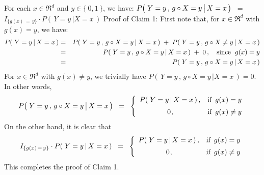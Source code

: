 For each $x \in \Re^{d}$ and $y \in \{\,0,1\,\}$, we have:
$P\!\left(\,\left. Y = y \,,\, \overset{{\color{white}.}}{g} \circ X = y \,\right\vert X = x \,\right)$
\,$=$\,
$I_{\{g(x)\,=\,y\}} \cdot P\!\left(\,\left. Y = y \,\right\vert X = x \,\right)$
\vskip 0.2cm
\noindent
Proof of Claim 1:\;
First note that, for $x \in \Re^{d}$ with $g(x) = y$, we have:
\begin{eqnarray*}
P\!\left(\,\left. Y = y \,\right\vert X = x \,\right)
& = &
	P\!\left(\,\left. Y = y\,,\, g \circ X = y \,\right\vert X = x \,\right)
	\; + \;
	P\!\left(\,\left. Y = y\,,\, g \circ X \neq y \,\right\vert X = x \,\right)
\\
& = &
	P\!\left(\,\left. Y = y\,,\, g \circ X = y \,\right\vert X = x \,\right)
	\; + \;
	0\,,
	\quad
	\textnormal{since \;$g(x) = y$}
\\
& = &
	P\!\left(\,\left. Y = y\,,\, g \circ X = y \,\right\vert X = x \,\right)
\end{eqnarray*}
For $x \in \Re^{d}$ with $g(x) \neq y$, we trivially have
$P\!\left(\,\left. Y = y\,,\, g \circ X = y \,\right\vert X = x \,\right) = 0$.
In other words,
\begin{equation*}
P\!\left(\,\left. Y = y \,,\, \overset{{\color{white}.}}{g} \circ X = y \,\right\vert X = x \,\right)
\;\; = \;\;
	\left\{\begin{array}{cl}
	P\!\left(\,\left. Y = y \,\right\vert X = x \,\right), & \textnormal{if \,$g(x) = y$}
	\\
	\overset{{\color{white}-}}{0}, & \textnormal{if \,$g(x) \neq y$}
	\end{array}\right.
\end{equation*}
On the other hand, it is clear that
\begin{equation*}
I_{\{g(x)\,=\,y\}} \cdot P\!\left(\,\left. Y = y \,\right\vert X = x \,\right)
\;\; = \;\;
	\left\{\begin{array}{cl}
	P\!\left(\,\left. Y = y \,\right\vert X = x \,\right), & \textnormal{if \,$g(x) = y$}
	\\
	\overset{{\color{white}-}}{0}, & \textnormal{if \,$g(x) \neq y$}
	\end{array}\right.
\end{equation*}
This completes the proof of Claim 1.

